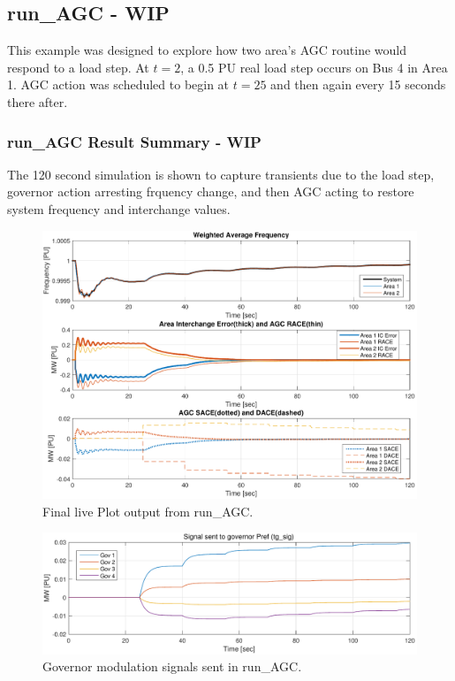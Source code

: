 \subsection{run\_AGC - WIP}
This example was designed to explore how two area's AGC routine would respond to a load step.
At $t=2$, a 0.5 PU real load step occurs on Bus 4 in Area 1.
AGC action was scheduled to begin at $t=25$ and then again every 15 seconds there after.

\subsubsection{run\_AGC Result Summary - WIP}
The 120 second simulation is shown to capture transients due to the load step, governor action arresting frquency change, and then AGC acting to restore system frequency and interchange values.


\begin{figure}[H]
	\centering
	\footnotesize
	\includegraphics[width=\linewidth]{examples/agc/run-AGC-1}
	\caption{Final live Plot output from run\_AGC.}
	\label{fig: runAGC liveplot}
\end{figure}%

\begin{figure}[H]
	\centering
	\footnotesize
	\includegraphics[width=\linewidth]{examples/agc/run-AGC-2}
	\caption{Governor modulation signals sent in run\_AGC.}
	\label{fig: runAGC tg}
\end{figure}%

